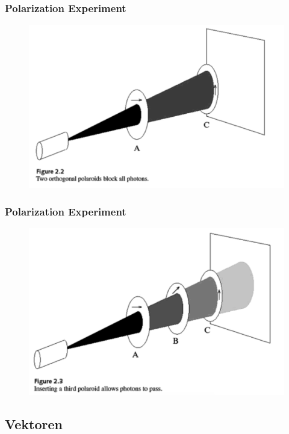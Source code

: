 \documentclass{beamer}
\begin{document}
\begin{frame}
\frametitle{Polarization Experiment}
\begin{figure}
\centering
\includegraphics[width=\textwidth]{polar2.png}
\label{polar2}
\end{figure}
\end{frame}

\begin{frame}
\frametitle{Polarization Experiment}
\begin{figure}
\centering
\includegraphics[width=\textwidth]{polar3.png}
\label{polar3}
\end{figure}
\end{frame}

\subsection{Vektoren}
\end{document}
